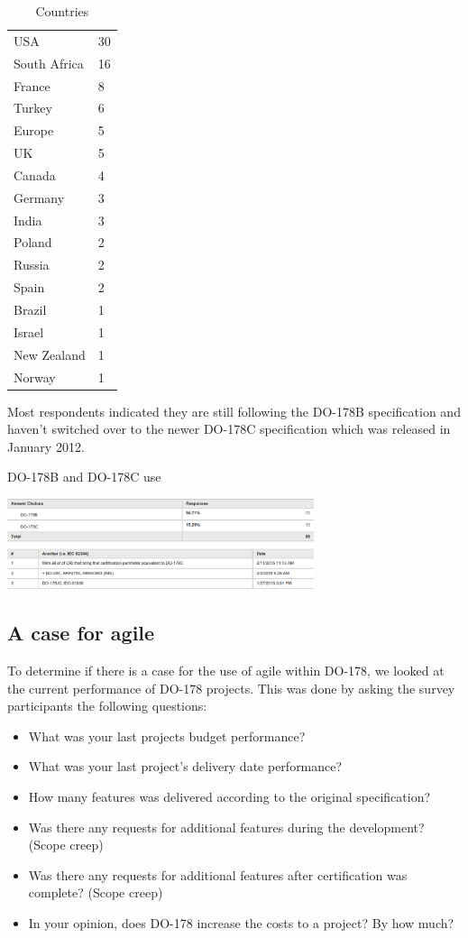 \documentclass{sig-alternate-05-2015}
\begin{document}
\begin{table}[]
	\centering
	\caption{Countries}
	\label{Countries}
	\begin{tabular}{l|l}
		USA  	        & 30 \\
		South Africa	& 16 \\
		France			& 8  \\
		Turkey	 		& 6  \\
		Europe			& 5  \\
		UK				& 5  \\
		Canada		 	& 4  \\
		Germany			& 3  \\
		India		 	& 3  \\
		Poland		 	& 2  \\
		Russia		 	& 2  \\
		Spain		 	& 2  \\
		Brazil		 	& 1  \\
		Israel		 	& 1  \\
		New Zealand	 	& 1  \\
		Norway		 	& 1  \\
	\end{tabular}
\end{table}

Most respondents indicated they are still following the DO-178B specification and haven't switched over to the newer DO-178C specification which was released in January 2012.

\begin{table}[t!]
	\centering
	\caption{DO-178B and DO-178C use}
	\includegraphics[width=90mm]{BvsC.png}
\end{table}

\subsection{A case for agile}
To determine if there is a case for the use of agile within DO-178, we looked at the current performance of DO-178 projects. This was done by asking the survey participants the following questions:

\begin{itemize}
	\item What was your last projects budget performance?
	\item What was your last project's delivery date performance?
	\item How many features was delivered according to the original specification?
	\item Was there any requests for additional features during the development? (Scope creep)
	\item Was there any requests for additional features after certification was complete? (Scope creep)
	\item In your opinion, does DO-178 increase the costs to a project? By how much?
\end{itemize}
\end{document}
